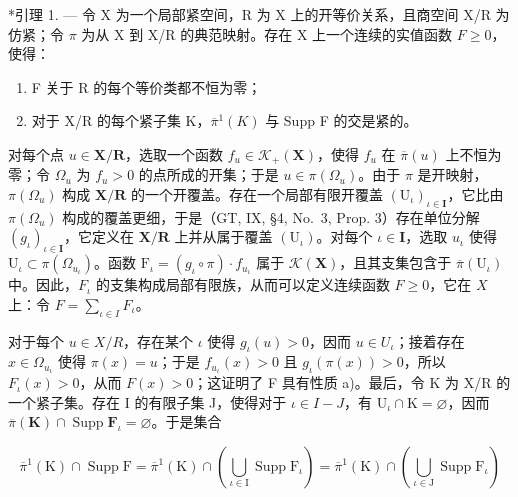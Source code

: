 \appendixheading

*引理 1. --- 令 X 为一个局部紧空间，R 为 X 上的开等价关系，且商空间 X/R 为仿紧；令 \(\pi\) 为从 X 到 X/R 的典范映射。存在 X 上一个连续的实值函数 \(F \geqslant 0\)，使得：

\begin{enumerate}
\def\labelenumi{\alph{enumi})}
\item
  F 关于 R 的每个等价类都不恒为零；
\item
  对于 X/R 的每个紧子集 K，\(\overline{\pi}^{1}(K)\) 与 Supp F 的交是紧的。
\end{enumerate}

对每个点 \(u \in \mathbf{X} / \mathbf{R}\)，选取一个函数 \(f_{u} \in \mathcal{K}_{+}(\mathbf{X})\)，使得 \(f_{u}\) 在 \(\overline{\pi}(u)\) 上不恒为零；令 \(\Omega_{u}\) 为 \(f_{u} > 0\) 的点所成的开集；于是 \(u \in \pi(\Omega_{u})\)。由于 \(\pi\) 是开映射，\(\pi(\Omega_{u})\) 构成 \(\mathbf{X} / \mathbf{R}\) 的一个开覆盖。存在一个局部有限开覆盖 \((\mathrm{U}_{\iota})_{\iota \in \mathbf{I}}\)，它比由 \(\pi(\Omega_{u})\) 构成的覆盖更细，于是（GT, IX, §4, No.~3, Prop. 3）存在单位分解 \((g_{\iota})_{\iota \in \mathbf{I}}\)，它定义在 \(\mathbf{X} / \mathbf{R}\) 上并从属于覆盖 \((\mathrm{U}_{\iota})\)。对每个 \(\iota \in \mathbf{I}\)，选取 \(u_{\iota}\) 使得 \(\mathrm{U}_{\iota} \subset \pi(\Omega_{u_{\iota}})\)。函数 \(\mathrm{F}_{\iota} = (g_{\iota} \circ \pi) \cdot f_{u_{\iota}}\) 属于 \(\mathcal{K}(\mathbf{X})\)，且其支集包含于 \(\overline{\pi}(\mathrm{U}_{\iota})\) 中。因此，\(F_{\iota}\) 的支集构成局部有限族，从而可以定义连续函数 \(F \geqslant 0\)，它在 \(X\) 上：令 \(F = \sum_{\iota \in I} F_{\iota}\)。

对于每个 \(u \in X/R\)，存在某个 \(\iota\) 使得 \(g_{\iota}(u) > 0\)，因而 \(u \in U_{\iota}\)；接着存在 \(x \in \Omega_{u_{\iota}}\) 使得 \(\pi(x) = u\)；于是 \(f_{u_{\iota}}(x) > 0\) 且 \(g_{\iota}(\pi(x)) > 0\)，所以 \(F_{\iota}(x) > 0\)，从而 \(F(x) > 0\)；这证明了 F 具有性质 a)。最后，令 K 为 X/R 的一个紧子集。存在 I 的有限子集 J，使得对于 \(\iota \in I - J\)，有 \(\mathrm{U}_{\iota}\cap \mathrm{K} = \varnothing\)，因而 \(\overline{\pi} (\mathbf{K})\cap \operatorname {Supp}\mathbf{F}_{\iota} = \varnothing\)。于是集合

\[
\overline {{\pi}} ^ {1} (\mathrm{K}) \cap \operatorname{Supp} \mathrm{F} = \overline {{\pi}} ^ {1} (\mathrm{K}) \cap \left(\bigcup_ {\iota \in \mathrm{I}} \operatorname{Supp} \mathrm{F} _ {\iota}\right) = \overline {{\pi}} ^ {1} (\mathrm{K}) \cap \left(\bigcup_ {\iota \in \mathrm{J}} \operatorname{Supp} \mathrm{F} _ {\iota}\right)
\]

